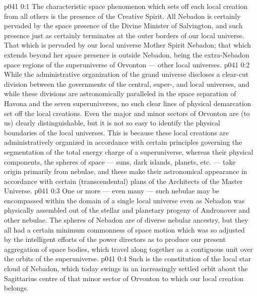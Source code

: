 \author{Archangel}
\vs p041 0:1 The characteristic space phenomenon which sets off each local creation from all others is the presence of the Creative Spirit. All Nebadon is certainly pervaded by the space presence of the Divine Minister of Salvington, and such presence just as certainly terminates at the outer borders of our local universe. That which is pervaded by our local universe Mother Spirit  Nebadon; that which extends beyond her space presence is outside Nebadon, being the extra\hyp{}Nebadon space regions of the superuniverse of Orvonton --- other local universes.
\vs p041 0:2 \pc While the administrative organization of the grand universe discloses a clear\hyp{}cut division between the governments of the central, super-, and local universes, and while these divisions are astronomically paralleled in the space separation of Havona and the seven superuniverses, no such clear lines of physical demarcation set off the local creations. Even the major and minor sectors of Orvonton are (to us) clearly distinguishable, but it is not so easy to identify the physical boundaries of the local universes. This is because these local creations are administratively organized in accordance with certain  principles governing the segmentation of the total energy charge of a superuniverse, whereas their physical components, the spheres of space --- suns, dark islands, planets, etc. --- take origin primarily from nebulae, and these make their astronomical appearance in accordance with certain  (transcendental) plans of the Architects of the Master Universe.
\vs p041 0:3 One or more --- even many --- such nebulae may be encompassed within the domain of a single local universe even as Nebadon was physically assembled out of the stellar and planetary progeny of Andronover and other nebulae. The spheres of Nebadon are of diverse nebular ancestry, but they all had a certain minimum commonness of space motion which was so adjusted by the intelligent efforts of the power directors as to produce our present aggregation of space bodies, which travel along together as a contiguous unit over the orbits of the superuniverse.
\vs p041 0:4 Such is the constitution of the local star cloud of Nebadon, which today swings in an increasingly settled orbit about the Sagittarius centre of that minor sector of Orvonton to which our local creation belongs.
